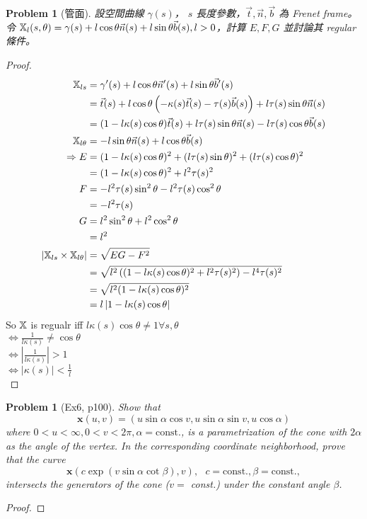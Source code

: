 \documentclass[10pt,a4paper]{article}
\newcounter{theProblemCounter}
\newtheorem{problem}[theProblemCounter]{Problem}
\begin{document}
\setcounter{theProblemCounter}{2}
\begin{problem}[管面]
設空間曲線 $\gamma(s)$， $s$ 長度參數，$\vec{t}, \vec{n}, \vec{b}$ 為 Frenet frame。令 $\mathbb{X}_l(s,\theta)=\gamma(s)+l\cos\theta\vec{n}(s) + l\sin\theta\vec{b}(s), l>0$，計算 $E, F, G$ 並討論其 regular 條件。
\end{problem}
\begin{proof}
\begin{align*}
\mathbb{X}_{ls}&=\gamma'(s)+l\cos\theta\vec{n}'(s) + l\sin\theta\vec{b}'(s)\\
&=\vec{t}(s)+l\cos\theta\left(-\kappa(s)\vec{t}(s)-\tau(s)\vec{b}(s)\right) + l\tau(s)\sin\theta\vec{n}(s)\\
&=(1-l\kappa(s)\cos\theta)\vec{t}(s) + l\tau(s)\sin\theta\vec{n}(s) - l\tau(s)\cos\theta\vec{b}(s)\\
\mathbb{X}_{l\theta}&=-l\sin\theta\vec{n}(s) + l\cos\theta\vec{b}(s)\\
\Rightarrow E&=(1-l\kappa(s)\cos\theta)^2+(l\tau(s)\sin\theta)^2+(l\tau(s)\cos\theta)^2\\
&=(1-l\kappa(s)\cos\theta)^2+l^2\tau(s)^2\\
F&=-l^2\tau(s)\sin^2\theta-l^2\tau(s)\cos^2\theta\\
&=-l^2\tau(s)\\
G&=l^2\sin^2\theta+l^2\cos^2\theta\\
&=l^2\\
\left|\mathbb{X}_{ls}\times\mathbb{X}_{l\theta}\right|&=\sqrt{EG-F^2}\\
&=\sqrt{l^2\left((1-l\kappa(s)\cos\theta)^2+l^2\tau(s)^2\right)-l^4\tau(s)^2}\\
&=\sqrt{l^2(1-l\kappa(s)\cos\theta)^2}\\
&=l\left|1-l\kappa(s)\cos\theta\right|\\
\end{align*}
So $\mathbb{X}$ is regualr iff $l\kappa(s)\cos\theta\neq 1 \forall s,\theta$\\
$\Leftrightarrow \frac{1}{l\kappa(s)}\neq \cos\theta$\\
$\Leftrightarrow \left|\frac{1}{l\kappa(s)}\right|>1$\\
$\Leftrightarrow \left|\kappa(s)\right|<\frac{1}{l}$\\
\end{proof}

\setcounter{theProblemCounter}{5}
\begin{problem}[Ex6, p100]
Show that
\[ \mathbf{x}(u, v) = (u\sin\alpha\cos v, u\sin\alpha\sin v, u\cos\alpha)
\]
where $0<u<\infty, 0<v<2\pi, \alpha=\mbox{const.}$,
is a parametrization of the cone with $2\alpha$ as the angle of the vertex. In the corresponding coordinate neighborhood, prove that the curve
\[
\mathbf{x}(c\exp(v\sin\alpha \cot \beta), v),\ \ \ c=\mbox{const.}, \beta = \mbox{const.},
\]
intersects the generators of the cone ($v=$ const.) under the constant angle $\beta$.
\end{problem}
\begin{proof}
\end{proof}
\end{document}
